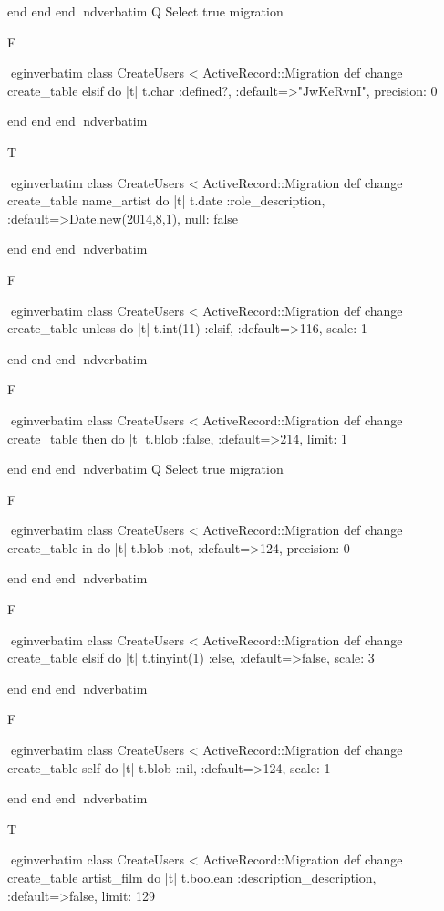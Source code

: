     end 
  end 
end
nd{verbatim}
Q
 Select true migration

F

egin{verbatim}
 class CreateUsers < ActiveRecord::Migration 
  def change 
    create_table elsif do |t| 
      t.char :defined?, :default=>"JwKeRvnI", precision: 0
    
    end 
  end 
end
nd{verbatim}

T

egin{verbatim}
 class CreateUsers < ActiveRecord::Migration 
  def change 
    create_table name_artist do |t| 
      t.date :role_description, :default=>Date.new(2014,8,1), null: false
    
    end 
  end 
end
nd{verbatim}

F

egin{verbatim}
 class CreateUsers < ActiveRecord::Migration 
  def change 
    create_table unless do |t| 
      t.int(11) :elsif, :default=>116, scale: 1
    
    end 
  end 
end
nd{verbatim}

F

egin{verbatim}
 class CreateUsers < ActiveRecord::Migration 
  def change 
    create_table then do |t| 
      t.blob :false, :default=>214, limit: 1
    
    end 
  end 
end
nd{verbatim}
Q
 Select true migration

F

egin{verbatim}
 class CreateUsers < ActiveRecord::Migration 
  def change 
    create_table in do |t| 
      t.blob :not, :default=>124, precision: 0
    
    end 
  end 
end
nd{verbatim}

F

egin{verbatim}
 class CreateUsers < ActiveRecord::Migration 
  def change 
    create_table elsif do |t| 
      t.tinyint(1) :else, :default=>false, scale: 3
    
    end 
  end 
end
nd{verbatim}

F

egin{verbatim}
 class CreateUsers < ActiveRecord::Migration 
  def change 
    create_table self do |t| 
      t.blob :nil, :default=>124, scale: 1
    
    end 
  end 
end
nd{verbatim}

T

egin{verbatim}
 class CreateUsers < ActiveRecord::Migration 
  def change 
    create_table artist_film do |t| 
      t.boolean :description_description, :default=>false, limit: 129
    
